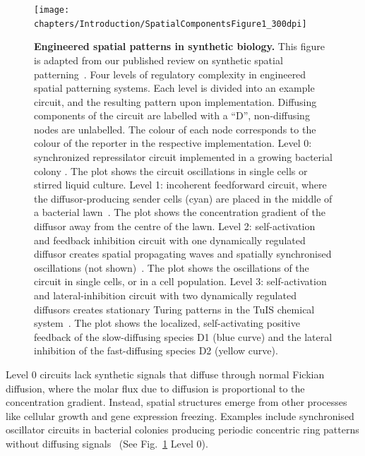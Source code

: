 \begin{figure}[H]
    \centering
    \texttt{[image: chapters/Introduction/SpatialComponentsFigure1\_300dpi]}
    \caption{\textbf{Engineered spatial patterns in synthetic biology.} This figure is adapted from our published review on synthetic spatial patterning~\parencite{huidobro}. Four levels of regulatory complexity in engineered spatial patterning systems. Each level is divided into an example circuit, and the resulting pattern upon implementation. Diffusing components of the circuit are labelled with a “D”, non-diffusing nodes are unlabelled. The colour of each node corresponds to the colour of the reporter in the respective implementation. Level 0: synchronized repressilator circuit implemented in a growing bacterial colony \parencite{Potvin-Trottier2016}. The plot shows the circuit oscillations in single cells or stirred liquid culture. Level 1: incoherent feedforward circuit, where the diffusor-producing sender cells (cyan) are placed in the middle of a bacterial lawn~\parencite{Basu2005}. The plot shows the concentration gradient of the diffusor away from the centre of the lawn. Level 2: self-activation and feedback inhibition circuit with one dynamically regulated diffusor creates spatial propagating waves and spatially synchronised oscillations (not shown)~\parencite{Danino2010}. The plot shows the oscillations of the circuit in single cells, or in a cell population. Level 3: self-activation and lateral-inhibition circuit with two dynamically regulated diffusors creates stationary Turing patterns in the TuIS chemical system~\parencite{Horvath}. The plot shows the localized, self-activating positive feedback of the slow-diffusing species D1 (blue curve) and the lateral inhibition of the fast-diffusing species D2 (yellow curve).} %
    \label{fig:engineered_patterns}
\end{figure}

Level 0 circuits lack synthetic signals that diffuse through normal Fickian diffusion, where the molar flux due to diffusion is proportional to the concentration gradient.
Instead, spatial structures emerge from other processes like cellular growth and gene expression freezing.
Examples include synchronised oscillator circuits in bacterial colonies producing periodic concentric ring patterns without diffusing signals~\parencite{Potvin-Trottier2016, Riglar2019} (See Fig.~\ref{fig:engineered_patterns} Level 0).

